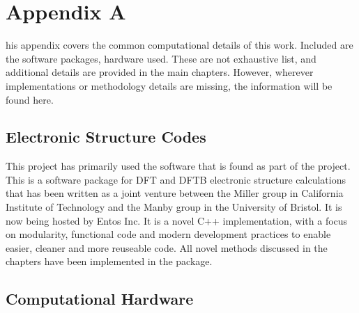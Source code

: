 %
%

\chapter{Appendix A}
\label{app:app01}

his appendix covers the common computational details of this work.
Included are the software packages, hardware used. These are not 
exhaustive list, and additional details are provided in the main chapters. However,
wherever implementations or methodology details are missing, the information will
be found here.

\section{Electronic Structure Codes}
This project has primarily used the  software that is found as part
of the  project. This is a software package for DFT and DFTB electronic
structure calculations that has been written as a joint venture between the Miller
group in California Institute of Technology and the Manby group in the 
University of Bristol. It is now being hosted by Entos Inc. It is a novel C++
implementation, with a focus on modularity, functional code and modern development
practices to enable easier, cleaner and more reuseable code.
All novel methods discussed in the chapters have been implemented in the  
package.


\section{Computational Hardware}







\